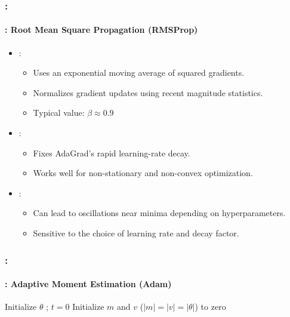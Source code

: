 \documentclass[xcolor=table]{beamer}
\begin{document}
\begin{frame}
	\frametitle{\insertshortsubtitle: \insertsection}
	\framesubtitle{\insertsubsection: Root Mean Square Propagation (RMSProp)}
	
	\begin{itemize}
		\item {}: 
		\begin{itemize}
			\item Uses an exponential moving average of squared gradients.
			\item Normalizes gradient updates using recent magnitude statistics.
			\item Typical value: $\beta \approx 0.9$
		\end{itemize}
		
		\item {}: 
		\begin{itemize}
			\item Fixes AdaGrad's rapid learning-rate decay.
			\item Works well for non-stationary and non-convex optimization.
		\end{itemize}
		
		\item {}: 
		\begin{itemize}
			\item Can lead to oscillations near minima depending on hyperparameters.
			\item Sensitive to the choice of learning rate and decay factor.
		\end{itemize}
	\end{itemize}
	
\end{frame}


\begin{frame}
	\frametitle{\insertshortsubtitle: \insertsection}
	\framesubtitle{\insertsubsection: Adaptive Moment Estimation (Adam)}
	
	\begin{algorithm}[H]
		\KwResult{$ \theta $}
		Initialize $ \theta $ ; $ t = 0 $\;
		Initialize $ m $ and $ v $ ($|m| = |v| = |\theta|$) to zero\;
		\caption{Adam \cite{2015-kingma-ba}}
	\end{algorithm}
	
\end{frame}
\end{document}
